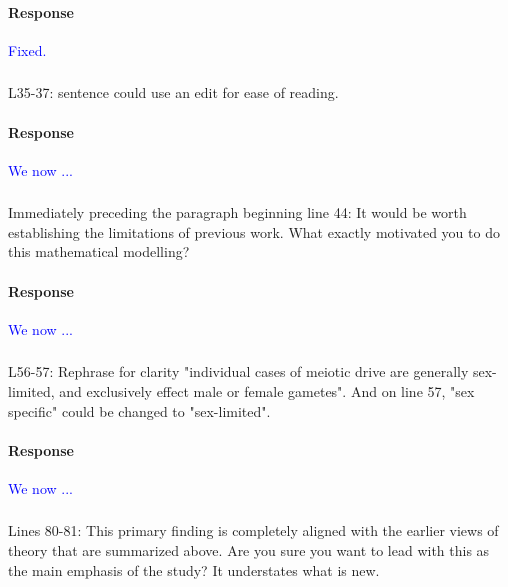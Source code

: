 \documentclass[10pt,letterpaper]{article}
\begin{document}
\noindent\paragraph{Response}
\textcolor{blue}{Fixed.}

\noindent\subsubsection{}
L35-37: sentence could use an edit for ease of reading.

\noindent\paragraph{Response}
\textcolor{blue}{We now ...}

\noindent\subsubsection{}
Immediately preceding the paragraph beginning line 44: It would be worth establishing the limitations of previous work. What exactly motivated you to do this mathematical modelling?

\noindent\paragraph{Response}
\textcolor{blue}{We now ...}

\noindent\subsubsection{}
L56-57: Rephrase for clarity "individual cases of meiotic drive are generally sex-limited, and exclusively effect male or female gametes". And on line 57, "sex specific" could be changed to "sex-limited".

\noindent\paragraph{Response}
\textcolor{blue}{We now ...}

\noindent\subsubsection{}
Lines 80-81: This primary finding is completely aligned with the earlier views of theory that are summarized above. Are you sure you want to lead with this as the main emphasis of the study? It understates what is new.
\end{document}
